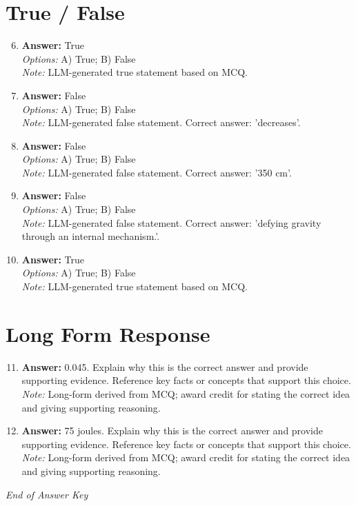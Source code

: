 \documentclass[12pt]{article}
\begin{document}
\section*{True / False}
\begin{enumerate}[label=\arabic*.]
\setcounter{enumi}{5}
\item \textbf{Answer:} True
\\ \textit{Options:} A) True; B) False
\\ \textit{Note:} LLM-generated true statement based on MCQ.
\item \textbf{Answer:} False
\\ \textit{Options:} A) True; B) False
\\ \textit{Note:} LLM-generated false statement. Correct answer: 'decreases'.
\item \textbf{Answer:} False
\\ \textit{Options:} A) True; B) False
\\ \textit{Note:} LLM-generated false statement. Correct answer: '350 cm'.
\item \textbf{Answer:} False
\\ \textit{Options:} A) True; B) False
\\ \textit{Note:} LLM-generated false statement. Correct answer: 'defying gravity through an internal mechanism.'.
\item \textbf{Answer:} True
\\ \textit{Options:} A) True; B) False
\\ \textit{Note:} LLM-generated true statement based on MCQ.
\end{enumerate}

\section*{Long Form Response}
\begin{enumerate}[label=\arabic*.]
\setcounter{enumi}{10}
\item \textbf{Answer:} 0.045. Explain why this is the correct answer and provide supporting evidence. Reference key facts or concepts that support this choice.
\\ \textit{Note:} Long-form derived from MCQ; award credit for stating the correct idea and giving supporting reasoning.
\item \textbf{Answer:} 75 joules. Explain why this is the correct answer and provide supporting evidence. Reference key facts or concepts that support this choice.
\\ \textit{Note:} Long-form derived from MCQ; award credit for stating the correct idea and giving supporting reasoning.
\end{enumerate}

\vfill
\noindent\textit{End of Answer Key}
\end{document}
